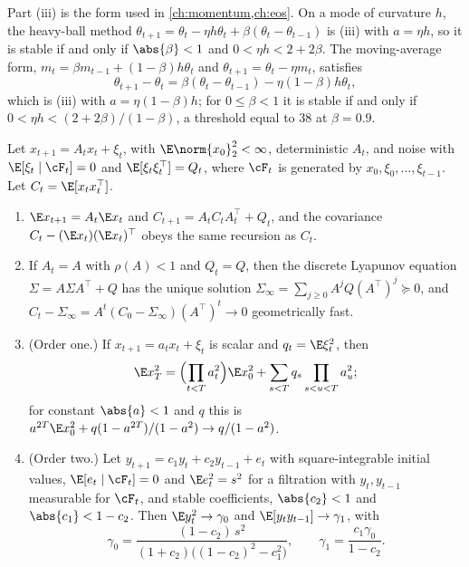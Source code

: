 \begin{refsection}
Part (iii) is the form used in \cref{ch:momentum,ch:eos}. On a mode of curvature $h$, the heavy-ball method $\theta_{t+1}=\theta_t-\eta h\theta_t+\beta(\theta_t-\theta_{t-1})$ is (iii) with $a=\eta h$, so it is stable if and only if $\abs{\beta}<1$ and $0<\eta h<2+2\beta$. The moving-average form, $m_t=\beta m_{t-1}+(1-\beta)h\theta_t$ and $\theta_{t+1}=\theta_t-\eta m_t$, satisfies
\[
  \theta_{t+1}-\theta_t=\beta(\theta_t-\theta_{t-1})-\eta(1-\beta)h\theta_t ,
\]
which is (iii) with $a=\eta(1-\beta)h$; for $0\le\beta<1$ it is stable if and only if $0<\eta h<(2+2\beta)/(1-\beta)$, a threshold equal to $38$ at $\beta=0.9$.

\begin{lemma}\label{lem:toolkit:lyapunov}
Let $x_{t+1}=A_tx_t+\xi_t$, with $\E\norm{x_0}_2^2<\infty$, deterministic $A_t$, and noise with $\E[\xi_t\mid\cF_t]=0$ and $\E[\xi_t\xi_t^\top]=Q_t$, where $\cF_t$ is generated by $x_0,\xi_0,\dots,\xi_{t-1}$. Let $C_t=\E[x_tx_t^\top]$.
\begin{enumerate}
\item $\E x_{t+1}=A_t\E x_t$ and $C_{t+1}=A_tC_tA_t^\top+Q_t$, and the covariance $C_t-(\E x_t)(\E x_t)^\top$ obeys the same recursion as $C_t$.
\item If $A_t=A$ with $\rho(A)<1$ and $Q_t=Q$, then the discrete Lyapunov equation $\Sigma=A\Sigma A^\top+Q$ has the unique solution $\Sigma_\infty=\sum_{j\ge0}A^jQ(A^\top)^j\succeq0$, and $C_t-\Sigma_\infty=A^t(C_0-\Sigma_\infty)(A^\top)^t\to0$ geometrically fast.
\item (Order one.) If $x_{t+1}=a_tx_t+\xi_t$ is scalar and $q_t=\E\xi_t^2$, then
\[
  \E x_T^2=\Bigl(\prod_{t<T}a_t^2\Bigr)\E x_0^2+\sum_{s<T}q_s\prod_{s<u<T}a_u^2 ;
\]
for constant $\abs{a}<1$ and $q$ this is $a^{2T}\E x_0^2+q(1-a^{2T})/(1-a^2)\to q/(1-a^2)$.
\item (Order two.) Let $y_{t+1}=c_1y_t+c_2y_{t-1}+e_t$ with square-integrable initial values, $\E[e_t\mid\cF_t]=0$ and $\E e_t^2=s^2$ for a filtration with $y_t,y_{t-1}$ measurable for $\cF_t$, and stable coefficients, $\abs{c_2}<1$ and $\abs{c_1}<1-c_2$. Then $\E y_t^2\to\gamma_0$ and $\E[y_ty_{t-1}]\to\gamma_1$, with
\begin{equation}\label{eq:toolkit:ar2}
  \gamma_0=\frac{(1-c_2)\,s^2}{(1+c_2)\bigl((1-c_2)^2-c_1^2\bigr)},\qquad\gamma_1=\frac{c_1\gamma_0}{1-c_2}.
\end{equation}
\end{enumerate}
\end{lemma}


\end{refsection}
